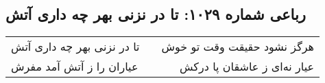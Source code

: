 \begin{center}
\section*{رباعی شماره ۱۰۲۹: تا در نزنی بهر چه داری آتش}
\label{sec:1029}
\begin{longtable}{l p{0.5cm} r}
تا در نزنی بهر چه داری آتش
&&
هرگز نشود حقیقت وقت تو خوش
\\
عیاران را ز آتش آمد مفرش
&&
عیار نه‌ای ز عاشقان پا درکش
\\
\end{longtable}
\end{center}
